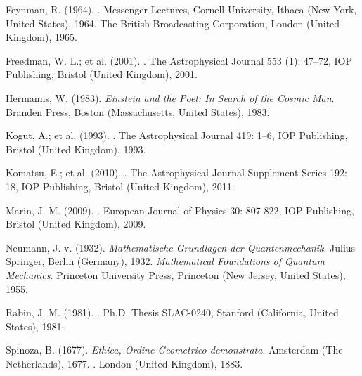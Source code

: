 \begin{thebibliography}{99}
 Feynman, R. (1964). . Messenger Lectures, Cornell University, Ithaca (New York, United States), 1964. The British Broadcasting Corporation, London (United Kingdom), 1965.

 Freedman, W. L.; et al. (2001). . The Astrophysical Journal 553 (1): 47–72, IOP Publishing, Bristol (United Kingdom), 2001.

 Hermanns, W. (1983). \textit{Einstein and the Poet: In Search of the Cosmic Man}. Branden Press, Boston (Massachusetts, United States), 1983.

 Kogut, A.; et al. (1993). . The Astrophysical Journal 419: 1–6, IOP Publishing, Bristol (United Kingdom), 1993.

 Komatsu, E.; et al. (2010). . The Astrophysical Journal Supplement Series 192: 18, IOP Publishing, Bristol (United Kingdom), 2011.

 Marin, J. M. (2009). . European Journal of Physics 30: 807-822, IOP Publishing, Bristol (United Kingdom), 2009.

 Neumann, J. v. (1932). \textit{Mathematische Grundlagen der Quantenmechanik}. Julius Springer, Berlin (Germany), 1932. \textit{Mathematical Foundations of Quantum Mechanics}. Princeton University Press, Princeton (New Jersey, United States), 1955.

 Rabin, J. M. (1981). . Ph.D. Thesis SLAC-0240, Stanford (California, United States), 1981.

 Spinoza, B. (1677). \textit{Ethica, Ordine Geometrico demonstrata}. Amsterdam (The Netherlands), 1677. . London (United Kingdom), 1883.

\end{thebibliography}
